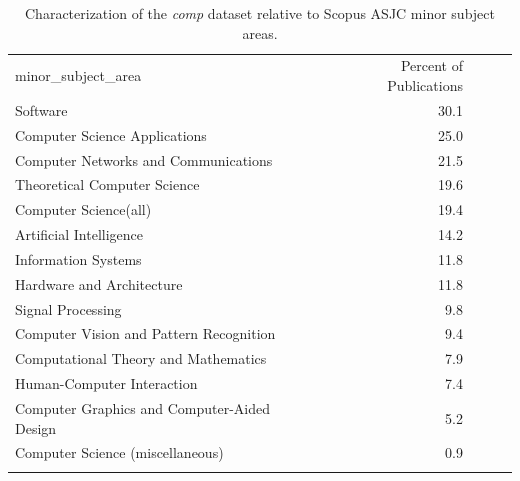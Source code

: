 \begin{table}[ht]
\caption{Characterization of the \emph{comp} dataset relative to Scopus ASJC minor subject areas.}
\label{tab:comp}       
\begin{tabular}{lrccc}
\hline\noalign{\smallskip}
minor\_subject\_area & Percent of Publications \\
\noalign{\smallskip}\hline\noalign{\smallskip}
Software & 30.1 \\
Computer Science Applications & 25.0 \\ 
Computer Networks and Communications & 21.5 \\
Theoretical Computer Science & 19.6 \\ 
Computer Science(all) & 19.4 \\ 
Artificial Intelligence & 14.2 \\ 
Information Systems & 11.8 \\ 
Hardware and Architecture & 11.8 \\ 
Signal Processing & 9.8 \\ 
Computer Vision and Pattern Recognition & 9.4 \\ 
Computational Theory and Mathematics & 7.9 \\ 
Human-Computer Interaction & 7.4 \\ 
Computer Graphics and Computer-Aided Design & 5.2 \\ 
Computer Science (miscellaneous) & 0.9 \\ 
\noalign{\smallskip}\hline
\end{tabular}
\end{table}
\newpage

